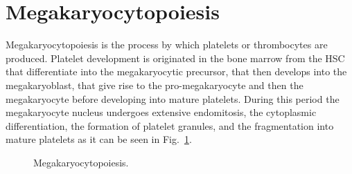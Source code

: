 \documentclass[final,a4paper,12pt,english]{UnicaPhdThesis3}
\begin{document}
\section{Megakaryocytopoiesis}
Megakaryocytopoiesis is the process by which platelets or thrombocytes are produced. Platelet development is originated in the bone marrow from the HSC that differentiate into the megakaryocytic precursor, that then develops into the megakaryoblast, that give rise to the pro-megakaryocyte and then the megakaryocyte before developing into mature platelets. During this period the megakaryocyte nucleus undergoes extensive endomitosis, the cytoplasmic differentiation, the formation of platelet granules, and the fragmentation into mature platelets as it can be seen in Fig.~\ref{fig:Megakaryocytopoiesis}.

\begin{figure}[!htbp]
\centering
\caption{\label{fig:Megakaryocytopoiesis} Megakaryocytopoiesis.}
\end{figure}
\end{document}
